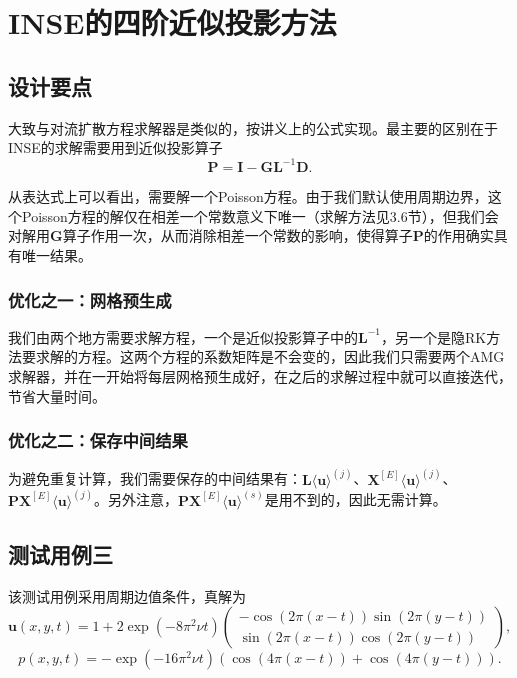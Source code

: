 \documentclass[lang=cn,10pt,bibend=bibtex]{elegantbook}
\begin{document}
\vspace{5em}

\chapter{INSE的四阶近似投影方法}

\section{设计要点}

大致与对流扩散方程求解器是类似的，按讲义上的公式实现。最主要的区别在于INSE的求解需要用到近似投影算子
\begin{equation*}
  \mathbf{P}=\mathbf{I}-\mathbf{GL}^{-1}\mathbf{D}.
\end{equation*}

从表达式上可以看出，需要解一个Poisson方程。由于我们默认使用周期边界，这个Poisson方程的解仅在相差一个常数意义下唯一（求解方法见3.6节），但我们会对解用$\mathbf{G}$算子作用一次，从而消除相差一个常数的影响，使得算子$\mathbf{P}$的作用确实具有唯一结果。

\subsection{优化之一：网格预生成}

我们由两个地方需要求解方程，一个是近似投影算子中的$\mathbf{L}^{-1}$，另一个是隐RK方法要求解的方程。这两个方程的系数矩阵是不会变的，因此我们只需要两个AMG求解器，并在一开始将每层网格预生成好，在之后的求解过程中就可以直接迭代，节省大量时间。

\subsection{优化之二：保存中间结果}

为避免重复计算，我们需要保存的中间结果有：$\mathbf{L}\langle\mathbf{u}\rangle^{(j)}$、$\mathbf{X}^{[E]}\langle\mathbf{u}\rangle^{(j)}$、$\mathbf{PX}^{[E]}\langle\mathbf{u}\rangle^{(j)}$。另外注意，$\mathbf{PX}^{[E]}\langle\mathbf{u}\rangle^{(s)}$是用不到的，因此无需计算。

\section{测试用例三}

该测试用例采用周期边值条件，真解为
\begin{equation*}
  \mathbf{u}(x,y,t)=1+2\exp(-8\pi^2\nu t)\left(\begin{array}{c}
    -\cos(2\pi(x-t))\sin(2\pi(y-t))\\
    \sin(2\pi(x-t))\cos(2\pi(y-t))
  \end{array}\right),
\end{equation*}
\begin{equation*}
  p(x,y,t)=-\exp(-16\pi^2\nu t)(\cos(4\pi(x-t))+\cos(4\pi(y-t))).
\end{equation*}
\end{document}
